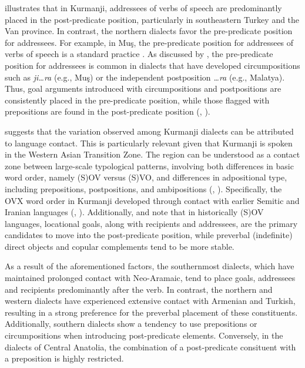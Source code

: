  illustrates that in Kurmanji, addressees of verbs of speech are predominantly placed in the post-predicate position, particularly in southeastern Turkey and the Van province. In contrast, the northern dialects favor the pre-predicate position for addressees. For example, in Muş, the pre-predicate position for addressees of verbs of speech is a standard practice \citep{Haig2022}. As discussed by \citet{Haig2014}, the pre-predicate position for addressees is common in dialects that have developed circumpositions such as \textit{ji…ra} (e.g., Muş) or the independent postposition \textit{…ra} (e.g., Malatya). Thus, goal arguments introduced with circumpositions and postpositions are consistently placed in the pre-predicate position, while those flagged with prepositions are found in the post-predicate position (\citealt{Gundogdu2019}, \citealt{Haig2022}).

\citet{Haig2014} suggests that the variation observed among Kurmanji dialects can be attributed to language contact. This is particularly relevant given that Kurmanji is spoken in the Western Asian Transition Zone. The region can be understood as a contact zone between large-scale typological patterns, involving both differences in basic word order, namely (S)OV versus (S)VO, and differences in adpositional type, including prepositions, postpositions, and ambipositions (\citealt{HaigKhan2019}, \citealt{HaigEtAl2024}). Specifically, the OVX word order in Kurmanji developed through contact with earlier Semitic and Iranian languages (\citealt{Haig2014}, \citealt{HaigThiele2014}). Additionally, \citet{Haig2020} and \citet{Haignforth} note that in historically (S)OV languages, locational goals, along with recipients and addressees, are the primary candidates to move into the post-predicate position, while preverbal (indefinite) direct objects and copular complements tend to be more stable.

As a result of the aforementioned factors, the southernmost dialects, which have maintained prolonged contact with Neo-Aramaic, tend to place goals, addressees and recipients predominantly after the verb. In contrast, the northern and western dialects have experienced extensive contact with Armenian and Turkish, resulting in a strong preference for the preverbal placement of these constituents. Additionally, southern dialects show a tendency to use prepositions or circumpositions when introducing post-predicate elements. Conversely, in the dialects of Central Anatolia, the combination of a post-predicate consituent with a preposition is highly restricted.


